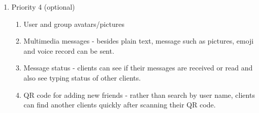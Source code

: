 \begin{enumerate}
\begin{enumerate}[label*=\arabic*.]
\end{enumerate}
\item Priority 4 (optional)
\begin{enumerate}[label*=\arabic*.]
\item User and group avatars/pictures
\item Multimedia messages - besides plain text, message such as pictures, emoji and voice record can be sent.
\item Message status - clients can see if their messages are received or read and also see  typing status of other clients.
\item QR code for adding new friends - rather than search by user name, clients can find another clients quickly after scanning their QR code.


\end{enumerate}
\end{enumerate}
